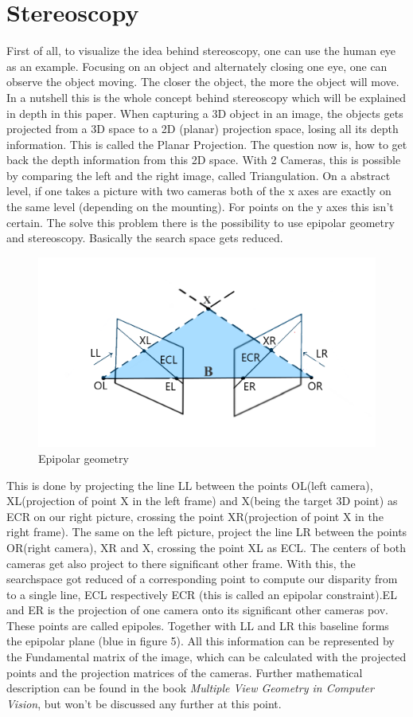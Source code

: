 \documentclass[journal,onecolumn]{IEEEtran}
\begin{document}
\section{Stereoscopy}
\noindent
First of all, to visualize the idea behind stereoscopy, one can use the human eye as an example. Focusing on an object and alternately closing one eye, one can observe the object moving. The closer the object, the more the object will move. In a nutshell this is the whole concept behind stereoscopy which will be explained in depth in this paper.
When capturing a 3D object in an image, the objects gets projected from a 3D space to a 2D (planar) projection space, losing all its depth information. This is called the Planar Projection. The question now is, how to get back the depth information from this 2D space.
With 2 Cameras, this is possible by comparing the left and the right image, called Triangulation.
On a abstract level, if one takes a picture with two cameras both of the x axes are exactly on the same level (depending on the mounting). For points on the y axes this isn't certain. The solve this problem there is the possibility to use epipolar geometry and stereoscopy.
Basically the search space gets reduced.
\begin{figure}[h!]
	\centering
	\includegraphics[scale=0.5]{epipolarGeometry.png}
	\caption{Epipolar geometry}
\end{figure}
This is done by projecting the line LL between the points OL(left camera), XL(projection of point X in the left frame) and X(being the target 3D point) as ECR on our right picture, crossing the point XR(projection of point X in the right frame). The same on the left picture, project the line LR between the points OR(right camera), XR and X, crossing the point XL as ECL. The centers of both cameras get also project to there significant other frame.
With this, the searchspace got reduced of a corresponding point to compute our disparity from to a single line, ECL respectively ECR (this is called an epipolar constraint).EL and ER is the projection of one camera onto its significant other cameras pov. These points are called epipoles. Together with LL and LR this baseline forms the epipolar plane (blue in figure 5). All this information can be represented by the Fundamental matrix of the image, which can be calculated with the projected points and the projection matrices of the cameras. Further mathematical description can be found in the book \emph{Multiple View Geometry in Computer Vision}\cite{hartley_zisserman_2004}, but won't be discussed any further at this point.
\end{document}
